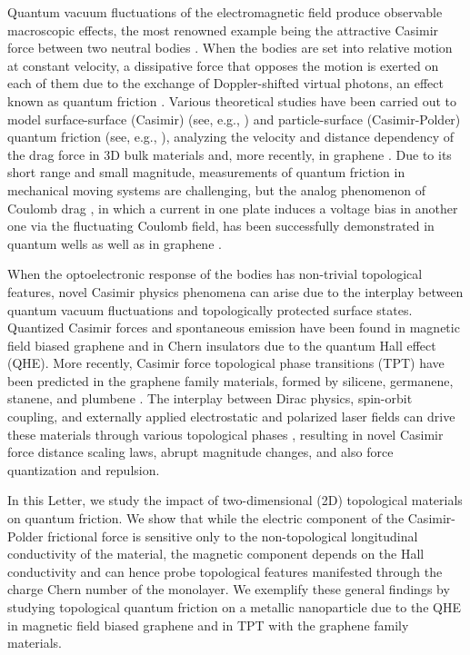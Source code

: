 \documentclass[10pt,aps,prl,superscriptaddress,showpacs,twocolumn]{revtex4-1}
\begin{document}
Quantum vacuum fluctuations of the electromagnetic field produce observable macroscopic effects, the most renowned example being the attractive Casimir force between two neutral bodies \cite{Casimir1948,Milonni,Springer,RMP}.  
When the bodies are set into relative motion at constant velocity, a dissipative force that opposes the motion is exerted on each of them due to the exchange of Doppler-shifted virtual photons, an effect known as quantum friction \cite{Pendry1997,Volokitin2007}. 
Various theoretical studies have been carried out to model surface-surface (Casimir) (see, e.g., \cite{Barton2011,Hoye2014}) 
and particle-surface (Casimir-Polder) quantum friction  (see, e.g., 
\cite{Scheel2009,Intravaia2014,Intravaia2016}), analyzing the velocity and distance dependency of the drag force in 3D bulk materials and, more recently, in graphene \cite{Volokitin2016,Farias2017}. Due to its short range and small magnitude, measurements of quantum friction in mechanical moving systems are challenging, but the analog phenomenon of Coulomb drag \cite{Pogrebinskii1977, Price1983,Volokitin2011}, in which a current in one plate induces a voltage bias in another one via the fluctuating Coulomb field, has been successfully demonstrated in quantum wells as well as in graphene \cite{Gramila1991,Gorbachev2012}.

When the optoelectronic response of the bodies has non-trivial topological features, novel Casimir physics phenomena can arise 
due to the interplay between quantum vacuum fluctuations and topologically protected surface states. 
Quantized Casimir forces and spontaneous emission have been found in magnetic field biased graphene \cite{Tse2012,Kort-Kamp2015} and in Chern insulators \cite{Rodriguez-Lopez2014} due to the quantum Hall effect (QHE). 
More recently, Casimir force topological phase transitions (TPT)  \cite{Rodriguez-Lopez2017} have been predicted in the graphene family materials, formed by silicene, germanene, stanene, and plumbene \cite{Castellanos2016,Mannix2017,Molle2017}. The interplay between Dirac physics, spin-orbit coupling, and externally applied electrostatic and polarized laser fields can drive these materials through various topological phases \cite{Ezawa2013}, resulting in novel Casimir force distance scaling laws, abrupt magnitude changes, and also force quantization and repulsion. 

In this Letter, we study the impact of two-dimensional (2D) topological materials on quantum friction. We show that while the electric component of the Casimir-Polder frictional force is sensitive only to the non-topological longitudinal conductivity of the material, the magnetic component depends on the Hall conductivity and can hence probe topological features manifested through the charge Chern number of the monolayer. We exemplify these general findings by studying topological quantum friction on a metallic nanoparticle due to the QHE in magnetic field biased graphene and in TPT with the graphene family materials.
\end{document}
